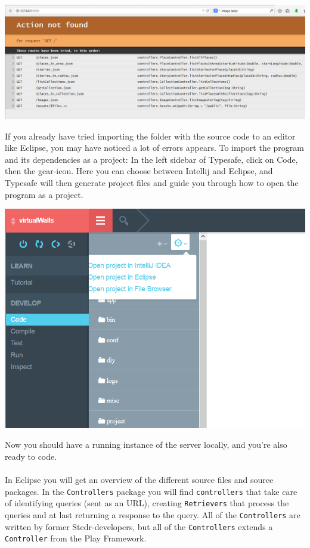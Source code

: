 \documentclass[11pt,a4paper,oneside]{article}
\begin{document}
\begin{center}
\includegraphics[scale=0.5]{guide/activator3.png} 
\end{center}

If you already have tried importing the folder with the source code to an editor like Eclipse, you may have noticed a lot of errors appears. To import the program and its dependencies as a project: In the left sidebar of Typesafe, click on Code, then the gear-icon. Here you can choose between Intellij and Eclipse, and Typesafe will then generate project files and guide you through how to open the program as a project. 
\begin{center}
\includegraphics[scale=0.6]{guide/activator4.png} 
\end{center}
Now you should have a running instance of the server locally, and you're also ready to code. 

\paragraph{}

In Eclipse you will get an overview of the different source files and source packages. In the \texttt{Controllers} package you will find \texttt{controllers} that take care of identifying queries (sent as an URL), creating \texttt{Retrievers} that process the queries and at last returning a response to the query. All of the  \texttt{Controllers} are written by former Stedr-developers, but all of the  \texttt{Controllers} extends a  \texttt{Controller} from the Play Framework.
\end{document}
